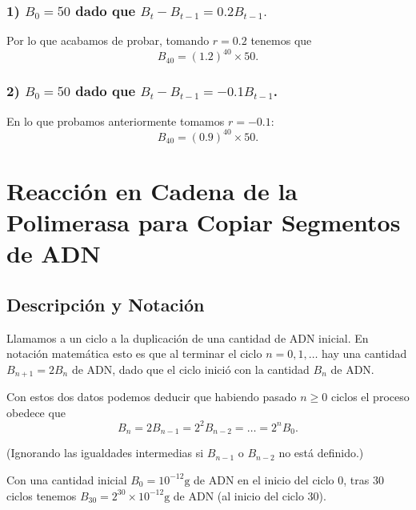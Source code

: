 \documentclass[11pt]{article}
\begin{document}
\hypertarget{b_050-dado-que-b_t-b_t-1-0.2-b_t-1.}{%
\subsubsection{\texorpdfstring{1) \(B_0=50\) dado que
\(B_t-B_{t-1}= 0.2 B_{t-1}.\)}{1) B\_0=50 dado que B\_t-B\_\{t-1\}= 0.2 B\_\{t-1\}.}}\label{b_050-dado-que-b_t-b_t-1-0.2-b_t-1.}}

Por lo que acabamos de probar, tomando \(r = 0.2\) tenemos que
\[B_{40} = (1.2)^{40} \times 50.\]

    \hypertarget{b_0-50-dado-que-b_t-b_t-1--0.1-b_t-1.}{%
\subsubsection{\texorpdfstring{2) \(B_0 = 50\) dado que
\(B_t-B_{t-1} = -0.1 B_{t-1}\).}{2) B\_0 = 50 dado que B\_t-B\_\{t-1\} = -0.1 B\_\{t-1\}.}}\label{b_0-50-dado-que-b_t-b_t-1--0.1-b_t-1.}}

En lo que probamos anteriormente tomamos \(r= -0.1\):
\[B_{40} = (0.9)^{40} \times 50.\]

    \hypertarget{reacciuxf3n-en-cadena-de-la-polimerasa-para-copiar-segmentos-de-adn}{%
\section{Reacción en Cadena de la Polimerasa para Copiar Segmentos de
ADN}\label{reacciuxf3n-en-cadena-de-la-polimerasa-para-copiar-segmentos-de-adn}}

    \hypertarget{descripciuxf3n-y-notaciuxf3n}{%
\subsection{Descripción y Notación}\label{descripciuxf3n-y-notaciuxf3n}}

Llamamos a un ciclo a la duplicación de una cantidad de ADN inicial. En
notación matemática esto es que al terminar el ciclo \(n=0,1,\ldots\)
hay una cantidad \(B_{n+1}=2B_n\) de ADN, dado que el ciclo inició con
la cantidad \(B_n\) de ADN.

    Con estos dos datos podemos deducir que habiendo pasado \(n\geq 0\)
ciclos el proceso obedece que
\[B_n = 2 B_{n-1} = 2^2 B_{n-2} =\ldots = 2^n B_0.\]

(Ignorando las igualdades intermedias si \(B_{n-1}\) o \(B_{n-2}\) no
está definido.)

    Con una cantidad inicial \(B_0 = 10^{-12}\text{g}\) de ADN en el inicio
del ciclo 0, tras 30 ciclos tenemos
\(B_{30} = 2^{30}\times 10^{-12}\text{g}\) de ADN (al inicio del ciclo
30).
\end{document}
